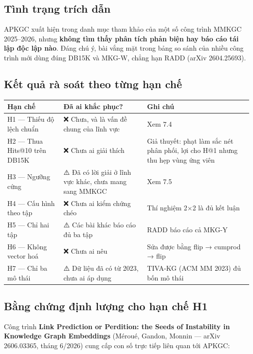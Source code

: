 \documentclass[11pt,a4paper]{article}
\newcommand{\code}[1]{{\ttfamily\small\color{codetext}#1}}
\begin{document}
\subsection{Tình trạng trích dẫn}
APKGC xuất hiện trong danh mục tham khảo của một số công trình MMKGC 2025--2026, nhưng \textbf{không tìm thấy phân tích phản biện hay báo cáo tái lập độc lập nào}. Đáng chú ý, bài vắng mặt trong bảng so sánh của nhiều công trình mới dùng đúng DB15K và MKG-W, chẳng hạn RADD (arXiv 2604.25693).

\subsection{Kết quả rà soát theo từng hạn chế}
\begin{center}\small
\begin{tabular}{@{}lll@{}}
\toprule
\textbf{Hạn chế} & \textbf{Đã ai khắc phục?} & \textbf{Ghi chú}\\
\midrule
H1 --- Thiếu độ lệch chuẩn & ❌ Chưa, và là vấn đề chung của lĩnh vực & Xem 7.4\\
H2 --- Thua Hits@10 trên DB15K & ❌ Chưa ai giải thích & Giả thuyết: phạt làm sắc nét phân phối, lợi cho H@1 nhưng thu hẹp vùng ứng viên\\
H3 --- Ngưỡng cứng & ⚠️ Đã có lời giải ở lĩnh vực khác, chưa mang sang MMKGC & Xem 7.5\\
H4 --- Cấu hình theo tập & ❌ Chưa ai kiểm chứng chéo & Thí nghiệm 2$\times$2 là đủ kết luận\\
H5 --- Chỉ hai tập & ⚠️ Các bài khác báo cáo đủ ba tập & RADD báo cáo cả MKG-Y\\
H6 --- Không vector hoá & ❌ Chưa ai nêu & Sửa được bằng \code{flip → cumprod → flip}\\
H7 --- Chỉ ba mô thái & ⚠️ Dữ liệu đã có từ 2023, chưa ai áp dụng & TIVA-KG (ACM MM 2023) đủ bốn mô thái\\
\bottomrule
\end{tabular}
\end{center}
\subsection{Bằng chứng định lượng cho hạn chế H1}
Công trình \textbf{Link Prediction or Perdition: the Seeds of Instability in Knowledge Graph Embeddings} (Méroué, Gandon, Monnin --- arXiv 2606.03365, tháng 6/2026) cung cấp con số trực tiếp liên quan tới APKGC:
\end{document}
